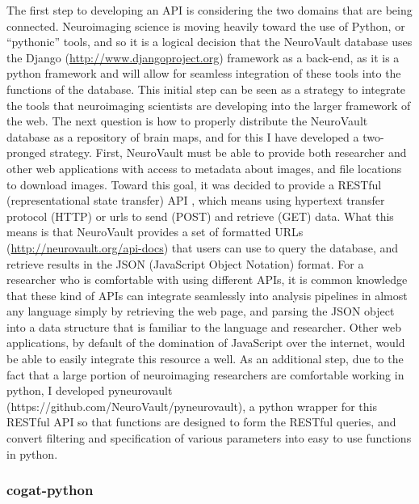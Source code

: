 \documentclass{report}
\begin{document}
The first step to developing an API is considering the two domains that
are being connected. Neuroimaging science is moving heavily toward the
use of Python, or ``pythonic'' tools, and so it is a logical decision
that the NeuroVault database uses the Django
(\href{http://www.djangoproject.org}{http://www.djangoproject.org})
framework as a back-end, as it is a python framework and will allow for
seamless integration of these tools into the functions of the database.
This initial step can be seen as a strategy to integrate the tools that
neuroimaging scientists are developing into the larger framework of the
web. The next question is how to properly distribute the NeuroVault
database as a repository of brain maps, and for this I have developed a
two-pronged strategy. First, NeuroVault must be able to provide both
researcher and other web applications with access to metadata about
images, and file locations to download images. Toward this goal, it was
decided to provide a RESTful (representational state transfer) API
\cite{Pautasso2014-lr}, which means using hypertext transfer protocol (HTTP) or urls to send
(POST) and retrieve (GET) data. What this means is that NeuroVault
provides a set of formatted URLs
(\href{http://neurovault.org/api-docs}{http://neurovault.org/api-docs})
that users can use to query the database, and retrieve results in the
JSON (JavaScript Object Notation) format. For a researcher who is
comfortable with using different APIs, it is common knowledge that these
kind of APIs can integrate seamlessly into analysis pipelines in almost
any language simply by retrieving the web page, and parsing the JSON
object into a data structure that is familiar to the language and
researcher. Other web applications, by default of the domination of
JavaScript over the internet, would be able to easily integrate this
resource a well. As an additional step, due to the fact that a large
portion of neuroimaging researchers are comfortable working in python, I
developed pyneurovault (https://github.com/NeuroVault/pyneurovault), a
python wrapper for this RESTful API so that functions are designed to
form the RESTful queries, and convert filtering and specification of
various parameters into easy to use functions in python.

\subsubsection{cogat-python}
\end{document}
